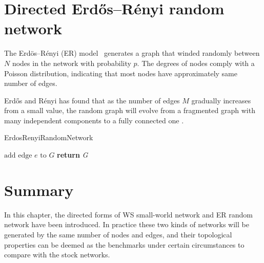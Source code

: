 \section{Directed Erdős–Rényi random network}
The Erdös–Rényi (ER) model~\cite{random} generates a graph that winded randomly between $N$ nodes in the network with probability $p$. The degrees of nodes comply with a Poisson distribution, indicating that most nodes have approximately same number of edges.

Erdős and Rényi has found that as the number of edges $M$ gradually increases from a small value, the random graph will evolve from a fragmented graph with many independent components to a fully connected one \cite{strogatz2001exploring}.

\begin{algorithm}[H]
	\caption{ErdosRenyiRandomNetwork}\label{alg:random}
	\begin{algorithmic}[1]
			 {$\text{add edge }\textit{e}\text{ to }\textit{G}$}
			\EndIf
		\EndFor
		\State \textbf{return} {\textit{G}}
		\EndProcedure
	\end{algorithmic}
\end{algorithm}

\section{Summary}
In this chapter, the directed forms of WS small-world network and ER random network have been introduced. In practice these two kinds of networks will be generated by the same number of nodes and edges, and their topological properties can be deemed as the benchmarks under certain circumstances to compare with the stock networks.